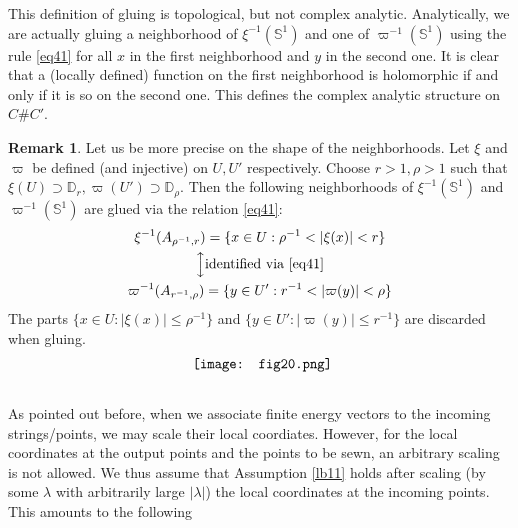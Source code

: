 \documentclass[11pt,b5paper,notitlepage]{article}
\theoremstyle{definition}
\newtheorem{rem}[df]{Remark}
\theoremstyle{plain}
\newcommand{\Dbb}{\mathbb D}
\newcommand{\Sbb}{{\mathbb S}}
\numberwithin{equation}{section}
\begin{document}
This definition of gluing is topological, but not complex analytic. Analytically, we are actually gluing a neighborhood of $\xi^{-1}(\Sbb^1)$ and one of $\varpi^{-1}(\Sbb^1)$ using the rule \eqref{eq41} for all $x$ in the first neighborhood and $y$ in the second one. It is clear that a (locally defined) function on the first neighborhood is holomorphic if and only if it is so on the second one. This defines the complex analytic structure on $C\#C'$.


\begin{rem}\label{lb33}
Let us be more precise on the shape of the neighborhoods. Let $\xi$ and $\varpi$ be defined (and injective) on $U,U'$ respectively. Choose $r>1,\rho>1$ such that $\xi(U)\supset \Dbb_r,\varpi(U')\supset\Dbb_\rho$. Then the following neighborhoods of $\xi^{-1}(\Sbb^1)$ and $\varpi^{-1}(\Sbb^1)$ are glued via the relation \eqref{eq41}:
\begin{gather}\label{eq154}
	\begin{gathered}
\xi^{-1}(A_{\rho^{-1},r})=\{x\in U: \rho^{-1}<|\xi(x)|<r\}\\
\Big\updownarrow\text{identified via } \eqref{eq41}\\	
\varpi^{-1}(A_{r^{-1},\rho})=\{y\in U':r^{-1}<|\varpi(y)|<\rho\}
	\end{gathered}	
\end{gather}
The parts $\{x\in U:|\xi(x)|\leq \rho^{-1}\}$ and $\{y\in U':|\varpi(y)|\leq r^{-1}\}$ are discarded when gluing.
\begin{align}
	\vcenter{\hbox{{
				\texttt{[image: fig20.png]}}}}  \label{eq43}
\end{align}
\end{rem}



\subsection{}




As pointed out before, when we associate finite energy vectors to the incoming  strings/points, we may scale their local coordiates. However, for the local coordinates at the output points and the points to be sewn, an arbitrary scaling is not allowed. We thus assume that Assumption \ref{lb11} holds after scaling (by some $\lambda$ with arbitrarily large $|\lambda|$) the local coordinates at the incoming points. This amounts to the following
\end{document}
